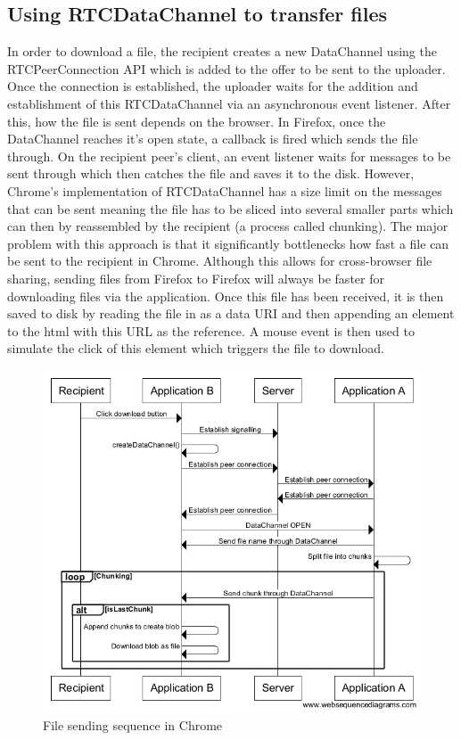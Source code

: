 \documentclass[]{report}
\begin{document}
			\subsection{Using RTCDataChannel to transfer files}
			In order to download a file, the recipient creates a new DataChannel using the RTCPeerConnection API which is added to the offer to be sent to the uploader. Once the connection is established, the uploader waits for the addition and establishment of this RTCDataChannel via an asynchronous event listener. After this, how the file is sent depends on the browser. In Firefox, once the DataChannel reaches it's open state, a callback is fired which sends the file through. On the recipient peer's client, an event listener waits for messages to be sent through which then catches the file and saves it to the disk. However, Chrome's implementation of RTCDataChannel has a size limit on the messages that can be sent meaning the file has to be sliced into several smaller parts which can then by reassembled by the recipient (a process called chunking). The major problem with this approach is that it significantly bottlenecks how fast a file can be sent to the recipient in Chrome. Although this allows for cross-browser file sharing, sending files from Firefox to Firefox will always be faster for downloading files via the application. Once this file has been received, it is then saved to disk by reading the file in as a data URI and then appending an element to the html with this URL as the reference. A mouse event is then used to simulate the click of this element which triggers the file to download. 
			
			\begin{figure}[H]
				\caption{File sending sequence in Chrome}
				\centering
				\includegraphics[scale=0.5]{file-sending-sequence-chrome.png}
			\end{figure}
			
\end{document}
